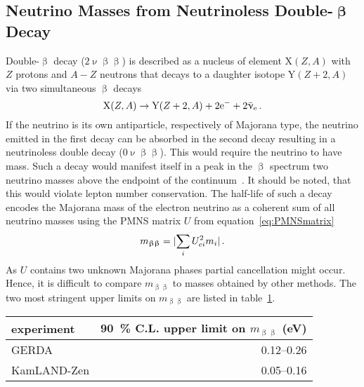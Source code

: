 \subsection[Neutrino Masses from Neutrinoless Double-\texorpdfstring{$\upbeta$}{beta} Decay]{Neutrino Masses from Neutrinoless Double-\texorpdfstring{$\boldsymbol{\upbeta}$}{beta} Decay}
\label{sec:neutrinoPhysicsAbsoluteNuMassMeasurementDoubleBeta}
Double-$\upbeta$ decay ($2\upnu\upbeta\upbeta$) is described as a nucleus of element $\mathrm{X}(Z,A)$ with $Z$ protons and $A-Z$ neutrons that decays to a daughter isotope $\mathrm{Y}(Z+2,A)$ via two simultaneous $\upbeta$ decays 
\begin{equation}
    \mathrm{X}(Z,A) \rightarrow \mathrm{Y}(Z+2,A) + 2\mathrm{e}^- + 2\bar{\upnu}_\mathrm{e} \text{\,.}
\end{equation}
If the neutrino is its own antiparticle, respectively of Majorana type, the neutrino emitted in the first decay can be absorbed in the second decay resulting in a neutrinoless double decay ($0\upnu\upbeta\upbeta$). This would require the neutrino to have mass. Such a decay would manifest itself in a peak in the $\upbeta$ spectrum two neutrino masses above the endpoint of the continuum~\cite{zuber2011neutrino}. It should be noted, that this would violate lepton number conservation. The half-life of such a decay encodes the Majorana mass of the electron neutrino as a coherent sum of all neutrino masses using the PMNS matrix $U$ from equation~\eqref{eq:PMNSmatrix}
\begin{equation}
    \label{eq:majoranaMass}
    m_{\upbeta\upbeta} = \lvert\sum_i U_{ei}^2 m_i\rvert \text{\,.}
\end{equation}
As $U$ contains two unknown Majorana phases partial cancellation might occur. Hence, it is difficult to compare $m_{\upbeta\upbeta}$ to masses obtained by other methods. The two most stringent upper limits on $m_{\upbeta\upbeta}$ are listed in table~\ref{tab:neutrinoPhysicsAbsoluteNuMassMeasurementDoubleBetaResults}.

\begin{table}
\begin{center}
	\begin{tabular}{lr}
		\toprule
		experiment & \SI{90}{\percent} C.L. upper limit on $m_{\upbeta\upbeta}$ (eV)\\
		\hline
		GERDA \cite{Agostini2018} &  0.12–0.26 \\
		KamLAND-Zen \cite{Gando2016} & 0.05–0.16 \\
		\bottomrule
	\end{tabular}
	\label{tab:neutrinoPhysicsAbsoluteNuMassMeasurementDoubleBetaResults}
\end{center}
\end{table}

